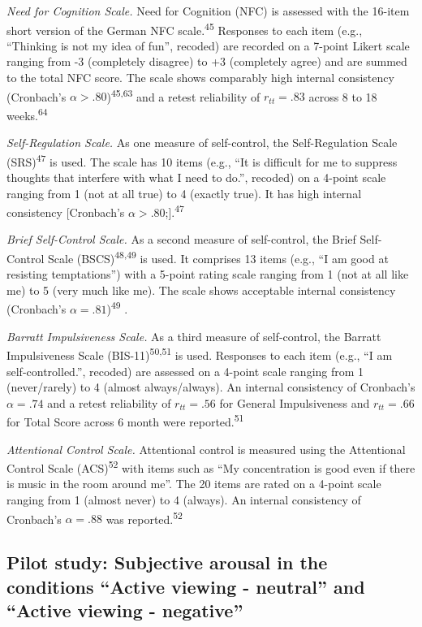 \documentclass[
  english,
  man,floatsintext]{apa6}
\begin{document}
\emph{Need for Cognition Scale.}
Need for Cognition (NFC) is assessed with the 16-item short version of the German NFC scale.\textsuperscript{45}
Responses to each item (e.g., ``Thinking is not my idea of fun'', recoded) are recorded on a 7-point Likert scale ranging from -3 (completely disagree) to +3 (completely agree) and are summed to the total NFC score.
The scale shows comparably high internal consistency (Cronbach's \(\alpha>.80\))\textsuperscript{45,63} and a retest reliability of \(r_{tt}=.83\) across 8 to 18 weeks.\textsuperscript{64}

\emph{Self-Regulation Scale.}
As one measure of self-control, the Self-Regulation Scale (SRS)\textsuperscript{47} is used.
The scale has 10 items (e.g., ``It is difficult for me to suppress thoughts that interfere with what I need to do.'', recoded) on a 4-point scale ranging from 1 (not at all true) to 4 (exactly true).
It has high internal consistency {[}Cronbach's \(\alpha>.80\);{]}.\textsuperscript{47}

\emph{Brief Self-Control Scale.}
As a second measure of self-control, the Brief Self-Control Scale (BSCS)\textsuperscript{48,49} is used.
It comprises 13 items (e.g., ``I am good at resisting temptations'') with a 5-point rating scale ranging from 1 (not at all like me) to 5 (very much like me).
The scale shows acceptable internal consistency (Cronbach's \(\alpha=.81\))\textsuperscript{49} .

\emph{Barratt Impulsiveness Scale.}
As a third measure of self-control, the Barratt Impulsiveness Scale (BIS-11)\textsuperscript{50,51} is used.
Responses to each item (e.g., ``I am self-controlled.'', recoded) are assessed on a 4-point scale ranging from 1 (never/rarely) to 4 (almost always/always).
An internal consistency of Cronbach's \(\alpha=.74\) and a retest reliability of \(r_{tt}=.56\) for General Impulsiveness and \(r_{tt}=.66\) for Total Score across 6 month were reported.\textsuperscript{51}

\emph{Attentional Control Scale.}
Attentional control is measured using the Attentional Control Scale (ACS)\textsuperscript{52} with items such as ``My concentration is good even if there is music in the room around me''.
The 20 items are rated on a 4-point scale ranging from 1 (almost never) to 4 (always).
An internal consistency of Cronbach's \(\alpha=.88\) was reported.\textsuperscript{52}

\newpage

\hypertarget{pilot-study-subjective-arousal-in-the-conditions-active-viewing---neutral-and-active-viewing---negative}{%
\subsection{Pilot study: Subjective arousal in the conditions ``Active viewing - neutral'' and ``Active viewing - negative''}\label{pilot-study-subjective-arousal-in-the-conditions-active-viewing---neutral-and-active-viewing---negative}}
\end{document}
